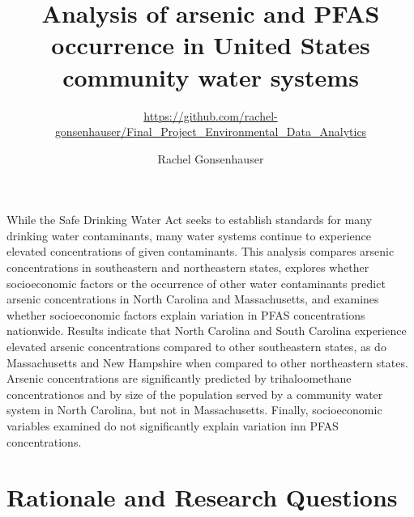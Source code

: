 \documentclass[12pt,]{article}
\title{Analysis of arsenic and PFAS occurrence in United States community water
systems}
\subtitle{\url{https://github.com/rachel-gonsenhauser/Final_Project_Environmental_Data_Analytics}}
\author{Rachel Gonsenhauser}
\date{}
\begin{document}
\maketitle

\newpage
\abstract

While the Safe Drinking Water Act seeks to establish standards for many
drinking water contaminants, many water systems continue to experience
elevated concentrations of given contaminants. This analysis compares
arsenic concentrations in southeastern and northeastern states, explores
whether socioeconomic factors or the occurrence of other water
contaminants predict arsenic concentrations in North Carolina and
Massachusetts, and examines whether socioeconomic factors explain
variation in PFAS concentrations nationwide. Results indicate that North
Carolina and South Carolina experience elevated arsenic concentrations
compared to other southeastern states, as do Massachusetts and New
Hampshire when compared to other northeastern states. Arsenic
concentrations are significantly predicted by trihaloomethane
concentrationos and by size of the population served by a community
water system in North Carolina, but not in Massachusetts. Finally,
socioeconomic variables examined do not significantly explain variation
inn PFAS concentrations.

\newpage
\tableofcontents 
\newpage
\listoftables
\newpage
\listoffigures 
\newpage

\hypertarget{rationale-and-research-questions}{%
\section{Rationale and Research
Questions}\label{rationale-and-research-questions}}
\end{document}
